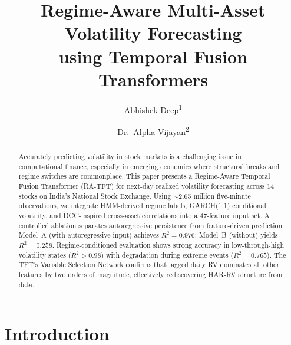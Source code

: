 \documentclass[runningheads]{llncs}
\begin{document}
\title{Regime-Aware Multi-Asset Volatility Forecasting\\using Temporal Fusion Transformers}
\titlerunning{}

\author{Abhishek Deep\textsuperscript{1} \and
Dr.\ Alpha Vijayan\textsuperscript{2}}
\authorrunning{}


\maketitle

\begin{abstract}
Accurately predicting volatility in stock markets is a challenging issue in computational finance, especially in emerging economies where structural breaks and regime switches are commonplace. This paper presents a Regime-Aware Temporal Fusion Transformer (RA-TFT) for next-day realized volatility forecasting across 14 stocks on India's National Stock Exchange. Using $\sim$2.65 million five-minute observations, we integrate HMM-derived regime labels, GARCH(1,1) conditional volatility, and DCC-inspired cross-asset correlations into a 47-feature input set. A controlled ablation separates autoregressive persistence from feature-driven prediction: Model~A (with autoregressive input) achieves $R^2 = 0.976$; Model~B (without) yields $R^2 = 0.258$. Regime-conditioned evaluation shows strong accuracy in low-through-high volatility states ($R^2 > 0.98$) with degradation during extreme events ($R^2 = 0.765$). The TFT's Variable Selection Network confirms that lagged daily RV dominates all other features by two orders of magnitude, effectively rediscovering HAR-RV structure from data.

\end{abstract}

\section{Introduction}\label{sec:intro}
\end{document}
